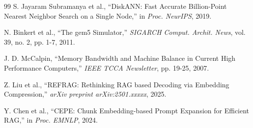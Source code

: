 \documentclass[conference]{IEEEtran}
\begin{document}
\begin{thebibliography}{99}
S. Jayaram Subramanya et al., ``DiskANN: Fast Accurate Billion-Point Nearest Neighbor Search on a Single Node,'' in \textit{Proc. NeurIPS}, 2019.

N. Binkert et al., ``The gem5 Simulator,'' \textit{SIGARCH Comput. Archit. News}, vol. 39, no. 2, pp. 1-7, 2011.

J. D. McCalpin, ``Memory Bandwidth and Machine Balance in Current High Performance Computers,'' \textit{IEEE TCCA Newsletter}, pp. 19-25, 2007.

Z. Liu et al., ``REFRAG: Rethinking RAG based Decoding via Embedding Compression,'' \textit{arXiv preprint arXiv:2501.xxxxx}, 2025.

Y. Chen et al., ``CEPE: Chunk Embedding-based Prompt Expansion for Efficient RAG,'' in \textit{Proc. EMNLP}, 2024.

\end{thebibliography}
\end{document}
